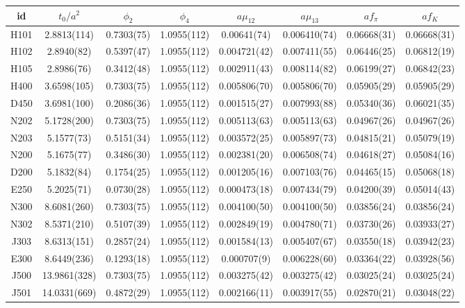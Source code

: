 \begin{sidewaystable}
\begin{center}
    \begin{tabular}{c c c c c c c c}
id & $t_0/a^2$ & $\phi_2$ & $\phi_4$ & $a\mu_{12}$ & $a\mu_{13}$ & $af_{\pi}$ & $af_K$ \\
\toprule
H101 & 2.8813(114) & 0.7303(75) & 1.0955(112) & 0.00641(74) & 0.006410(74) & 0.06668(31) & 0.06668(31) \\
H102 & 2.8940(82) & 0.5397(47) & 1.0955(112) & 0.004721(42) & 0.007411(55) & 0.06446(25) & 0.06812(19) \\
H105 & 2.8986(76) & 0.3412(48) & 1.0955(112) & 0.002911(43) & 0.008114(82) & 0.06199(27) & 0.06842(23) \\
\midrule
H400 & 3.6598(105) & 0.7303(75) & 1.0955(112) & 0.005806(70) & 0.005806(70) & 0.05905(29) & 0.05905(29) \\
D450 & 3.6981(100) & 0.2086(36) & 1.0955(112) & 0.001515(27) & 0.007993(88) & 0.05340(36) & 0.06021(35) \\
\midrule
N202 & 5.1728(200) & 0.7303(75) & 1.0955(112) & 0.005113(63) & 0.005113(63) & 0.04967(26) & 0.04967(26) \\
N203 & 5.1577(73) & 0.5151(34) & 1.0955(112) & 0.003572(25) & 0.005897(73) & 0.04815(21) & 0.05079(19) \\
N200 & 5.1675(77) & 0.3486(30) & 1.0955(112) & 0.002381(20) & 0.006508(74) & 0.04618(27) & 0.05084(16) \\
D200 & 5.1832(84) & 0.1754(25) & 1.0955(112) & 0.001205(16) & 0.007103(76) & 0.04465(15) & 0.05068(18) \\
E250 & 5.2025(71) & 0.0730(28) & 1.0955(112) & 0.000473(18) & 0.007434(79) & 0.04200(39) & 0.05014(43) \\
\midrule
N300 & 8.6081(260) & 0.7303(75) & 1.0955(112) & 0.004100(50) & 0.004100(50) & 0.03856(24) & 0.03856(24) \\
N302 & 8.5371(210) & 0.5107(39) & 1.0955(112) & 0.002849(19) & 0.004780(71) & 0.03730(26) & 0.03933(27) \\
J303 & 8.6313(151) & 0.2857(24) & 1.0955(112) & 0.001584(13) & 0.005407(67) & 0.03550(18) & 0.03942(23) \\
E300 & 8.6449(236) & 0.1293(18) & 1.0955(112) & 0.000707(9) & 0.006228(60) & 0.03364(22) & 0.03928(56) \\
\midrule
J500 & 13.9861(328) & 0.7303(75) & 1.0955(112) & 0.003275(42) & 0.003275(42) & 0.03025(24) & 0.03025(24) \\
J501 & 14.0331(669) & 0.4872(29) & 1.0955(112) & 0.002166(11) & 0.003917(55) & 0.02870(21) & 0.03048(22) \\

\end{tabular}
\end{center}
\end{sidewaystable}
